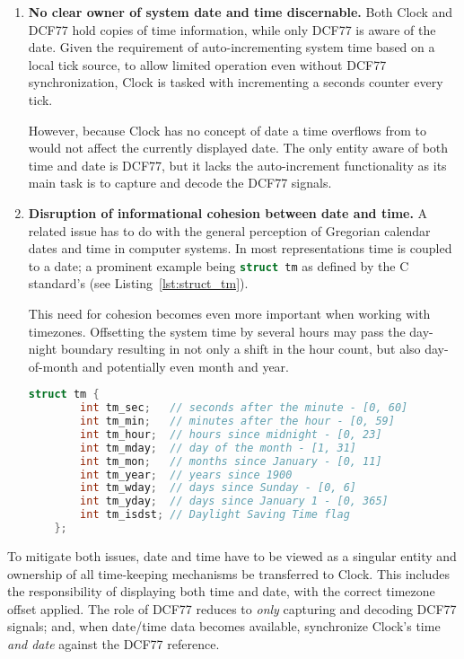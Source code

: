 \begin{enumerate}
    \item \textbf{No clear owner of system date and time discernable.} Both Clock and DCF77 hold copies of time information, while only DCF77 is aware of the date. Given the requirement of auto-incrementing system time based on a local tick source, to allow limited operation even without DCF77 synchronization, Clock is tasked with incrementing a seconds counter every  tick.

          However, because Clock has no concept of date a time overflows from  to  would not affect the currently displayed date. The only entity aware of both time and date is DCF77, but it lacks the auto-increment functionality as its main task is to capture and decode the DCF77 signals.

    \item \textbf{Disruption of informational cohesion between date and time.} A related issue has to do with the general perception of Gregorian calendar dates and time in computer systems. In most representations time is coupled to a date; a prominent example being \lstinline[language=C]{struct tm} as defined by the C standard's  (see Listing~\ref{lst:struct_tm}).

          This need for cohesion becomes even more important when working with timezones. Offsetting the system time by several hours may pass the day-night boundary resulting in not only a shift in the hour count, but also day-of-month and potentially even month and year.

          \begin{lstlisting}[language=C,caption={Date/time structure as defined by C standard~\cite{C99_dateandtime}.},label={lst:struct_tm}]
    struct tm {
        int tm_sec;   // seconds after the minute - [0, 60]
        int tm_min;   // minutes after the hour - [0, 59]
        int tm_hour;  // hours since midnight - [0, 23]
        int tm_mday;  // day of the month - [1, 31]
        int tm_mon;   // months since January - [0, 11]
        int tm_year;  // years since 1900
        int tm_wday;  // days since Sunday - [0, 6]
        int tm_yday;  // days since January 1 - [0, 365]
        int tm_isdst; // Daylight Saving Time flag
    };
    \end{lstlisting}
\end{enumerate}

To mitigate both issues, date and time have to be viewed as a singular entity and ownership of all time-keeping mechanisms be transferred to Clock. This includes the responsibility of displaying both time and date, with the correct timezone offset applied. The role of DCF77 reduces to \emph{only} capturing and decoding DCF77 signals; and, when date/time data becomes available, synchronize Clock's time \emph{and date} against the DCF77 reference.
